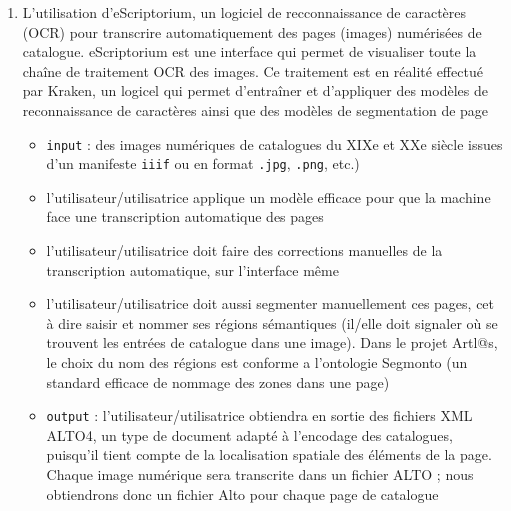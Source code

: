 \documentclass[a4paper,12pt,twoside]{book}
\begin{document}
\begin{enumerate}
	\item L'utilisation d'eScriptorium, un logiciel de recconnaissance de caractères (OCR) pour transcrire automatiquement des pages (images) numérisées de catalogue. eScriptorium est une interface qui permet de visualiser toute la chaîne de traitement OCR des images. Ce traitement est en réalité effectué par Kraken, un logicel qui permet d'entraîner et d'appliquer des modèles de reconnaissance de caractères ainsi que des modèles de segmentation de page
	\begin{itemize}
		\item \texttt{input} : des images numériques de catalogues du XIXe et XXe siècle issues d'un manifeste \texttt{iiif} ou en format \texttt{.jpg}, \texttt{.png}, etc.)
		\item l'utilisateur/utilisatrice applique un modèle efficace pour que la machine face une transcription automatique des pages
		\item l'utilisateur/utilisatrice doit faire des corrections manuelles de la transcription automatique, sur l'interface même
		\item l'utilisateur/utilisatrice doit aussi segmenter manuellement ces pages, cet à dire saisir et nommer ses régions sémantiques (il/elle doit signaler où se trouvent les entrées de catalogue dans une image). Dans le projet Artl@s, le choix du nom des régions est conforme a l'ontologie Segmonto (un standard efficace de nommage des zones dans une page)

		\item \texttt{output} : l'utilisateur/utilisatrice obtiendra en sortie des fichiers XML ALTO4, un type de document adapté à l'encodage des catalogues, puisqu'il tient compte de la localisation spatiale des éléments de la page. Chaque image numérique sera transcrite dans un fichier ALTO ; nous obtiendrons donc un fichier Alto pour chaque page de catalogue
	\end{itemize}
	

\end{enumerate}
\end{document}
